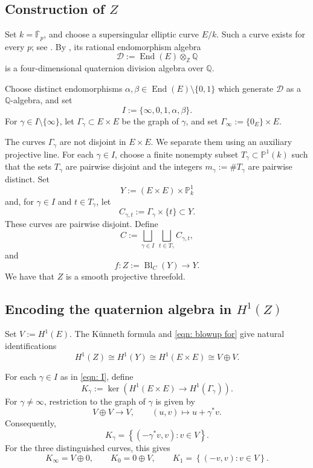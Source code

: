 \documentclass[11pt, reqno]{amsart}
\theoremstyle{definition}
\newcommand\QQ{\mathbb{Q}}
\newcommand\PP{\mathbb{P}}
\newcommand\ZZ{\mathbb{Z}}
\newcommand\FF{\mathbb{F}}
\DeclareMathOperator{\End}{End}
\DeclareMathOperator{\Bl}{Bl}
\begin{document}
\subsection{Construction of $Z$}\;

Set $k=\overline{\FF}_p$, and choose a supersingular elliptic curve $E/k$.
Such a curve exists for every $p$; see
\cite[Chapter~V, \S4]{Silverman-AEC}.  By
\cite[Remark~III.9.2 and Theorem~V.3.1(a)(iv)]{Silverman-AEC}, its
rational endomorphism algebra
\[
\mathcal D:=\End(E)\otimes_{\ZZ}\QQ
\]
is a four-dimensional quaternion division algebra over $\QQ$.

Choose distinct endomorphisms $\alpha,\beta\in\End(E)\setminus\{0,1\}$
which generate $\mathcal D$ as a $\QQ$-algebra, and set
\begin{equation}
    \label{eqn: I}
    I:=\{\infty,0,1,\alpha,\beta\}.
\end{equation}
For $\gamma\in I\setminus\{\infty\}$, let $\Gamma_\gamma\subset E\times E$
be the graph of $\gamma$, and set $\Gamma_\infty:=\{0_E\}\times E$.

The curves $\Gamma_\gamma$ are not disjoint in $E\times E$.  We
separate them using an auxiliary projective line.  For each $\gamma\in I$,
choose a finite nonempty subset $T_\gamma\subset\PP^1(k)$
such that the sets $T_\gamma$ are pairwise disjoint and the integers
$m_\gamma:=\#T_\gamma$ are pairwise distinct.  Set
\[
Y:=(E\times E)\times\PP^1_k
\]
and, for $\gamma\in I$ and $t\in T_\gamma$, let
\[
C_{\gamma,t}:=\Gamma_\gamma\times\{t\}\subset Y.
\]
These curves are pairwise disjoint.  Define
\[
C:=\bigsqcup_{\gamma\in I}\ \bigsqcup_{t\in T_\gamma}C_{\gamma,t},\]
and
\[f:Z:=\Bl_C(Y)\longrightarrow Y.
\]
We have that $Z$ is a smooth projective threefold.


\subsection{Encoding the quaternion algebra in $H^1(Z)$}
\label{subsubsec:encoding-quaternion-algebra}\;

Set $V:=H^1(E)$.
The K\"unneth formula and \eqref{eqn: blowup for} give natural identifications
\[
H^1(Z)\cong H^1(Y)\cong H^1(E\times E)
\cong V\oplus V.
\]

For each $\gamma\in I$ as in \eqref{eqn: I}, define
\[
K_\gamma:=
\ker\left(
H^1(E\times E)\longrightarrow H^1(\Gamma_\gamma)
\right).
\]
For $\gamma\neq\infty$, restriction to the graph of $\gamma$ is given by
\[
V\oplus V\longrightarrow V,
\qquad
(u,v)\longmapsto u+\gamma^*v.
\]
Consequently,
\[
K_\gamma
=
\left\{(-\gamma^*v,v):v\in V\right\}.
\]
For the three distinguished curves, this gives
\[
K_\infty=V\oplus 0,
\qquad
K_0=0\oplus V,
\qquad
K_1=\left\{(-v,v):v\in V\right\}.
\]
\end{document}
